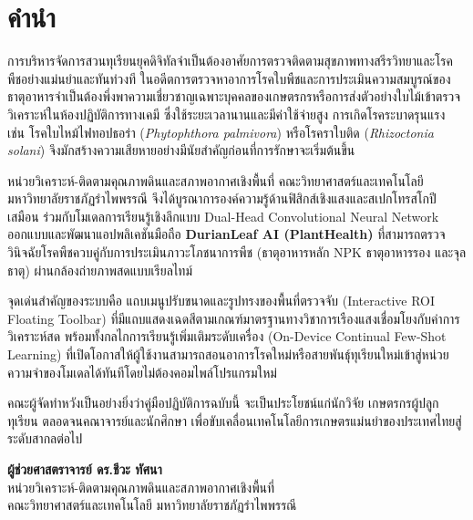 \chapter*{คำนำ}

การบริหารจัดการสวนทุเรียนยุคดิจิทัลจำเป็นต้องอาศัยการตรวจติดตามสุขภาพทางสรีรวิทยาและโรคพืชอย่างแม่นยำและทันท่วงที ในอดีตการตรวจหาอาการโรคใบพืชและการประเมินความสมบูรณ์ของธาตุอาหารจำเป็นต้องพึ่งพาความเชี่ยวชาญเฉพาะบุคคลของเกษตรกรหรือการส่งตัวอย่างใบไม้เข้าตรวจวิเคราะห์ในห้องปฏิบัติการทางเคมี ซึ่งใช้ระยะเวลานานและมีค่าใช้จ่ายสูง การเกิดโรคระบาดรุนแรง เช่น โรคใบไหม้ไฟทอปธอร่า (\textit{Phytophthora palmivora}) หรือโรคราใบติด (\textit{Rhizoctonia solani}) จึงมักสร้างความเสียหายอย่างมีนัยสำคัญก่อนที่การรักษาจะเริ่มต้นขึ้น

หน่วยวิเคราะห์-ติดตามคุณภาพดินและสภาพอากาศเชิงพื้นที่ คณะวิทยาศาสตร์และเทคโนโลยี มหาวิทยาลัยราชภัฏรำไพพรรณี จึงได้บูรณาการองค์ความรู้ด้านฟิสิกส์เชิงแสงและสเปกโทรสโกปีเสมือน ร่วมกับโมเดลการเรียนรู้เชิงลึกแบบ Dual-Head Convolutional Neural Network ออกแบบและพัฒนาแอปพลิเคชันมือถือ \textbf{DurianLeaf AI (PlantHealth)} ที่สามารถตรวจวินิจฉัยโรคพืชควบคู่กับการประเมินภาวะโภชนาการพืช (ธาตุอาหารหลัก NPK ธาตุอาหารรอง และจุลธาตุ) ผ่านกล้องถ่ายภาพสดแบบเรียลไทม์

จุดเด่นสำคัญของระบบคือ แถบเมนูปรับขนาดและรูปทรงของพื้นที่ตรวจจับ (Interactive ROI Floating Toolbar) ที่มีแถบแสดงเฉดสีตามเกณฑ์มาตรฐานทางวิชาการเรืองแสงเชื่อมโยงกับค่าการวิเคราะห์สด พร้อมทั้งกลไกการเรียนรู้เพิ่มเติมระดับเครื่อง (On-Device Continual Few-Shot Learning) ที่เปิดโอกาสให้ผู้ใช้งานสามารถสอนอาการโรคใหม่หรือสายพันธุ์ทุเรียนใหม่เข้าสู่หน่วยความจำของโมเดลได้ทันทีโดยไม่ต้องคอมไพล์โปรแกรมใหม่

คณะผู้จัดทำหวังเป็นอย่างยิ่งว่าคู่มือปฏิบัติการฉบับนี้ จะเป็นประโยชน์แก่นักวิจัย เกษตรกรผู้ปลูกทุเรียน ตลอดจนคณาจารย์และนักศึกษา เพื่อขับเคลื่อนเทคโนโลยีการเกษตรแม่นยำของประเทศไทยสู่ระดับสากลต่อไป

\vspace{1.5cm}

\begin{flushright}
  \textbf{ผู้ช่วยศาสตราจารย์ ดร.ชีวะ ทัศนา}\\
  หน่วยวิเคราะห์-ติดตามคุณภาพดินและสภาพอากาศเชิงพื้นที่\\
  คณะวิทยาศาสตร์และเทคโนโลยี มหาวิทยาลัยราชภัฏรำไพพรรณี
\end{flushright}
